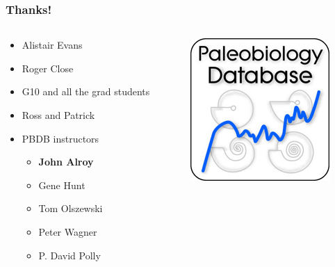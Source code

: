 \documentclass{beamer}\usepackage{graphicx, color}
\begin{document}
\begin{frame}
\frametitle{Thanks!}
\begin{columns}
\begin{column}{0.5\textwidth}
\begin{itemize}
\item Alistair Evans
\item Roger Close
\item G10 and all the grad students
\item Ross and Patrick
\item PBDB instructors
\begin{itemize}
\item \textbf{John Alroy}
\item Gene Hunt
\item Tom Olszewski
\item Peter Wagner
\item P. David Polly
\end{itemize}
\end{itemize}
\end{column}
\begin{column}{0.5\textwidth}
\includegraphics[width = \textwidth]{palio_bio}
\end{column}
\end{columns}
\end{frame}
\end{document}
